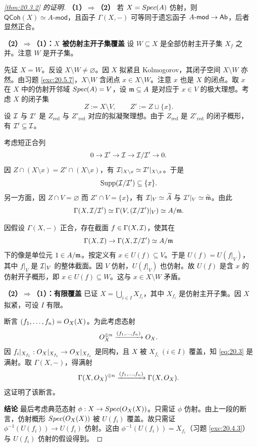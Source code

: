 \begin{proof}[\cref{thm:20.3.2} 的证明]
\medskip\noindent\textbf{（1）$\Rightarrow$（2）} 若 $X=Spec(A)$ 仿射，则 $\mathsf{QCoh}(X)\simeq A\text{-}\mathsf{mod}$，且函子 $\Gamma(X,-)$ 可等同于遗忘函子 $A\text{-}\mathsf{mod}\to\mathsf{Ab}$，后者显然正合。

\medskip\noindent\textbf{（2）$\Rightarrow$（1）：$X$ 被仿射主开子集覆盖} 设 $W\subseteq X$ 是全部仿射主开子集 $X_f$ 之并。注意 $W$ 是开子集。

先证 $X=W$。反设 $X\setminus W\ne\varnothing$。因 $X$ 拟紧且 Kolmogorov，其闭子空间 $X\setminus W$ 亦然。由习题 \ref{exc:20.5.7}，$X\setminus W$ 含闭点 $x\in X\setminus W$。注意 $x$ 也是 $X$ 的闭点。取 $x$ 在 $X$ 中的仿射开邻域 $Spec(A)=V$，设 $\mathfrak{m}\subseteq A$ 是对应于 $x\in V$ 的极大理想。考虑 $X$ 的闭子集
\[
Z:=X\setminus V,\qquad Z':=Z\sqcup\{x\}.
\]
设 $\mathcal{I}$ 与 $\mathcal{I}'$ 是 $Z_{\mathrm{red}}$ 与 $Z'_{\mathrm{red}}$ 对应的拟凝聚理想。由于 $Z_{\mathrm{red}}$ 是 $Z'_{\mathrm{red}}$ 的闭子概形，有 $\mathcal{I}'\subseteq\mathcal{I}$。

考虑短正合列
\[
0\to\mathcal{I}'\to\mathcal{I}\to\mathcal{I}/\mathcal{I}'\to 0.
\]
因 $Z\cap(X\setminus x)=Z'\cap(X\setminus x)$，有 $\mathcal{I}|_{X\setminus x}\simeq\mathcal{I}'|_{X\setminus x}$。于是
\[
\operatorname{Supp}(\mathcal{I}/\mathcal{I}')\subseteq\{x\}.
\]
另一方面，因 $Z\cap V=\varnothing$ 而 $Z'\cap V=\{x\}$，有 $\mathcal{I}|_V\simeq\widetilde{A}$ 与 $\mathcal{I}'|_V\simeq\widetilde{\mathfrak{m}}$。由此
\[
\Gamma(X,\mathcal{I}/\mathcal{I}')\simeq\Gamma(V,(\mathcal{I}/\mathcal{I}')|_V)\simeq A/\mathfrak{m}.
\]

因假设 $\Gamma(X,-)$ 正合，存在截面 $f\in\Gamma(X,\mathcal{I})$，使其在
\[
\Gamma(X,\mathcal{I})\to\Gamma(X,\mathcal{I}/\mathcal{I}')\simeq A/\mathfrak{m}
\]
下的像是单位元 $1\in A/\mathfrak{m}$。按定义有 $x\in U(f)\subseteq V$。于是 $U(f)=U(f|_V)$，其中 $f|_V$ 是 $\mathcal{I}|_V$ 的整体截面。因 $V$ 仿射，$U(f|_V)$ 也仿射。故 $U(f)$ 是含 $x$ 的仿射开子概形，即 $x\in U(f)\subseteq W$。这与 $x\in X\setminus W$ 矛盾。

\medskip\noindent\textbf{（2）$\Rightarrow$（1）：有限覆盖} 已证 $X=\bigcup_{i\in I}X_{f_i}$，其中 $X_{f_i}$ 是仿射主开子集。因 $X$ 拟紧，可设 $I$ 有限。

断言 $(f_1,\dots,f_n)=O_X(X)$。为此考虑态射
\begin{equation}\label{eq:20.3}
O_X^{\oplus n}\xrightarrow{(f_1,\dots,f_n)}O_X.
\end{equation}
因 $f_i|_{X_{f_i}}:O_X|_{X_{f_i}}\to O_X|_{X_{f_i}}$ 是同构，且 $X$ 被 $X_{f_i}\ (i\in I)$ 覆盖，知 \eqref{eq:20.3} 是满射。取 $\Gamma(X,-)$，得满射
\[
\Gamma(X,O_X)^{\oplus n}\xrightarrow{(f_1,\dots,f_n)}\Gamma(X,O_X).
\]
这证明了该断言。

\medskip\noindent\textbf{结论} 最后考虑典范态射 $\phi:X\to Spec(O_X(X))$。只需证 $\phi$ 仿射。由上一段的断言，仿射概形 $Spec(O_X(X))$ 被 $U(f_i)$ 覆盖。故只需证 $\phi^{-1}(U(f_i))\to U(f_i)$ 仿射。这由 $\phi^{-1}(U(f_i))=X_{f_i}$（习题 \ref{exc:20.4.3}）与 $U(f_i)$ 仿射的假设得到。
\end{proof}

